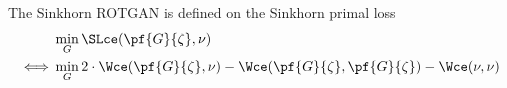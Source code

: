 \documentclass[11pt,a4paper]{article}
\begin{document}
The Sinkhorn ROTGAN is defined on the Sinkhorn primal loss
\begin{align}
    &\min_{G} \SLce(\pf{G}{\zeta}, \nu)  \\
    \iff & \min_{G} 2 \cdot \Wce(\pf{G}{\zeta}, \nu) - \Wce(\pf{G}{\zeta}, \pf{G}{\zeta}) - \Wce(\nu, \nu)
\end{align}
%
\end{document}
